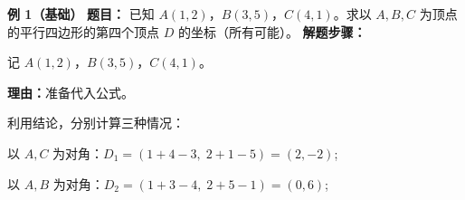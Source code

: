 \begin{examplebox}
	\textbf{\textcolor{CExample}{例 1（基础）}}
	\textbf{\textcolor{CExample}{题目：}}
	已知 $A(1,2)$，$B(3,5)$，$C(4,1)$。求以 $A,B,C$ 为顶点的平行四边形的第四个顶点 $D$ 的坐标（所有可能）。
	\textbf{\textcolor{CExample}{解题步骤：}}
	\begin{description}[style=nextline, leftmargin=2.8em, labelsep=0.5em, itemsep=0.45em]
		\item[\textbf{第一步（列出坐标）：}]记 $A(1,2)$，$B(3,5)$，$C(4,1)$。
			\par\textbf{理由：}准备代入公式。
		\item[\textbf{第二步（分情况套公式）：}]利用结论，分别计算三种情况：

			以 $A,C$ 为对角：$D_1 = (1+4-3,\;2+1-5) = (2,-2)$;

			以 $A,B$ 为对角：$D_2 = (1+3-4,\;2+5-1) = (0,6)$;


\end{description}
\end{examplebox}
